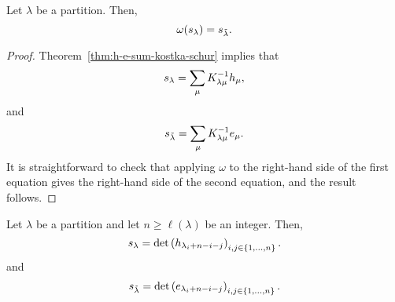 \begin{theorem}
    Let \(\lambda\) be a partition.
    Then,
    \begin{equation}
        \omega(s_{\lambda}) = s_{\tilde\lambda}.
    \end{equation}
\end{theorem}

\begin{proof}
    Theorem~\ref{thm:h-e-sum-kostka-schur} implies that
    \begin{equation}
        s_{\lambda} = \sum_{\mu} K_{\lambda \mu}^{-1} h_\mu,
    \end{equation}
    and 
    \begin{equation}
        s_{\tilde\lambda} = \sum_{\mu} K_{\lambda \mu}^{-1} e_\mu.
    \end{equation}
    It is straightforward to check that applying \(\omega\) to the right-hand side of the first equation gives the right-hand side of the second equation, and the result follows.
\end{proof}

\begin{theorem} \label{thm:jacobi-trudi}
    Let \(\lambda\) be a partition and let \(n \geq \ell(\lambda)\) be an integer.
    Then,
    \begin{equation}
        \schur{\lambda} = \det\left( h_{\lambda_i + n - i - j} \right)_{i, j \in \interval{n}}.
    \end{equation}
    and
    \begin{equation}
        \schur{\tilde\lambda} = \det\left( e_{\lambda_i + n - i - j} \right)_{i, j \in \interval{n}}.
    \end{equation}
\end{theorem}

